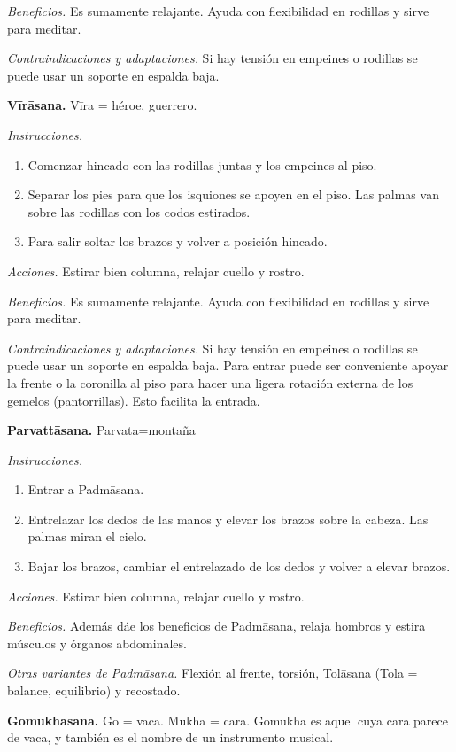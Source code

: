 \emph{Beneficios.} Es sumamente relajante.
Ayuda con flexibilidad en rodillas y sirve
para meditar.

\emph{Contraindicaciones y adaptaciones.} Si
hay tensión en empeines o rodillas se puede
usar un soporte en espalda baja.

\medskip\noindent\textbf{Vīrāsana.}
Vīra = héroe, guerrero.

\emph{Instrucciones.}
\begin{enumerate}
\item Comenzar hincado con las rodillas
juntas y los empeines al piso.
\item Separar los pies para que los isquiones
se apoyen en el piso. Las palmas van sobre
las rodillas con los codos estirados.
\item Para salir soltar los brazos y volver a
posición hincado.
\end{enumerate}

\emph{Acciones.} Estirar bien columna,
relajar cuello y rostro.

\emph{Beneficios.} Es sumamente relajante.
Ayuda con flexibilidad en rodillas y sirve
para meditar.

\emph{Contraindicaciones y adaptaciones.} Si
hay tensión en empeines o rodillas se puede
usar un soporte en espalda baja. Para entrar
puede ser conveniente apoyar la frente o la
coronilla al piso para hacer una ligera
rotación externa de los gemelos
(pantorrillas). Esto facilita la entrada.

\medskip\noindent\textbf{Parvattāsana.}
Parvata=montaña

\emph{Instrucciones.}
\begin{enumerate}
\item Entrar a Padmāsana.
\item Entrelazar los dedos de las manos y
elevar los brazos sobre la cabeza. Las palmas
miran el cielo.
\item Bajar los brazos, cambiar el
entrelazado de los dedos y volver a elevar
brazos.
\end{enumerate}

\emph{Acciones.} Estirar bien columna,
relajar cuello y rostro.

\emph{Beneficios.} Además dáe los beneficios
de Padmāsana, relaja hombros y estira
músculos y órganos abdominales.

\emph{Otras variantes de Padmāsana.} Flexión
al frente, torsión, Tolāsana (Tola = balance,
equilibrio) y recostado.

\medskip\noindent\textbf{Gomukhāsana.}
Go = vaca. Mukha = cara. Gomukha es aquel
cuya cara parece de vaca, y también es el
nombre de un instrumento musical.

